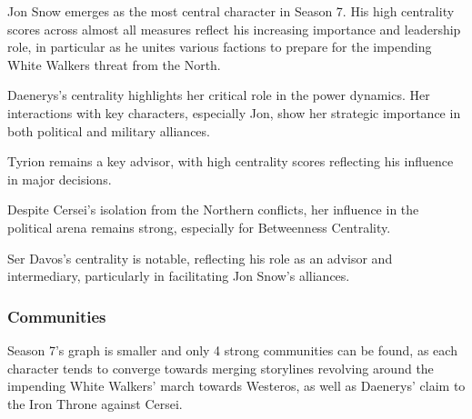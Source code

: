 \documentclass[10pt,twocolumn,letterpaper]{article}
\begin{document}
Jon Snow emerges as the most central character in Season 7. His high centrality scores across almost all measures reflect his increasing importance and leadership role, in particular as he unites various factions to prepare for the impending White Walkers threat from the North.

Daenerys's centrality highlights her critical role in the power dynamics. Her interactions with key characters, especially Jon, show her strategic importance in both political and military alliances. 

Tyrion remains a key advisor, with high centrality scores reflecting his influence in major decisions.

Despite Cersei's isolation from the Northern conflicts, her influence in the political arena remains strong, especially for Betweenness Centrality.

Ser Davos's centrality is notable, reflecting his role as an advisor and intermediary, particularly in facilitating Jon Snow's alliances.




\subsubsection{Communities}

Season 7's graph is smaller and only 4 strong communities can be found, as each character tends to converge towards merging storylines revolving around the impending White Walkers' march towards Westeros, as well as Daenerys' claim to the Iron Throne against Cersei.
\end{document}
